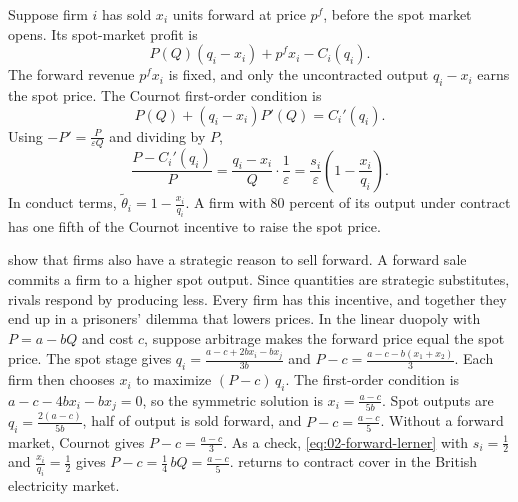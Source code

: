 \begin{example}\label{ex:02-forward}
Suppose firm $i$ has sold $x_i$ units forward at price $p^f$, before the spot market opens. Its spot-market profit is
\begin{equation*}
P(Q)\left(q_i - x_i\right) + p^f x_i - C_i(q_i) .
\end{equation*}
The forward revenue $p^f x_i$ is fixed, and only the uncontracted output $q_i - x_i$ earns the spot price. The Cournot
first-order condition is
\begin{equation*}
P(Q) + \left(q_i - x_i\right) P'(Q) = C_i'(q_i) .
\end{equation*}
Using $-P' = \frac{P}{\varepsilon Q}$ and dividing by $P$,
\begin{equation}\label{eq:02-forward-lerner}
\frac{P - C_i'(q_i)}{P} = \frac{q_i - x_i}{Q}\cdot\frac{1}{\varepsilon}
= \frac{s_i}{\varepsilon}\left(1 - \frac{x_i}{q_i}\right) .
\end{equation}
In conduct terms, $\tilde\theta_i = 1 - \frac{x_i}{q_i}$. A firm with 80 percent of its output under contract has
one fifth of the Cournot incentive to raise the spot price.
\end{example}

\citet{AllazVila1993} show that firms also have a strategic reason to sell forward. A forward sale commits a firm to
a higher spot output. Since quantities are strategic substitutes, rivals respond by producing less. Every firm has
this incentive, and together they end up in a prisoners' dilemma that lowers prices. In the linear duopoly with
$P = a - bQ$ and cost $c$, suppose arbitrage makes the forward price equal the spot price. The spot stage gives
$q_i = \frac{a - c + 2b x_i - b x_j}{3b}$ and $P - c = \frac{a - c - b(x_1 + x_2)}{3}$. Each firm then chooses $x_i$
to maximize $(P - c)\, q_i$. The first-order condition is $a - c - 4b x_i - b x_j = 0$, so the symmetric solution is
$x_i = \frac{a - c}{5b}$. Spot outputs are $q_i = \frac{2(a - c)}{5b}$, half of output is sold forward, and
$P - c = \frac{a - c}{5}$. Without a forward market, Cournot gives $P - c = \frac{a - c}{3}$. As a check,
\eqref{eq:02-forward-lerner} with $s_i = \frac{1}{2}$ and $\frac{x_i}{q_i} = \frac{1}{2}$ gives
$P - c = \frac{1}{4}\, b Q = \frac{a - c}{5}$.  returns to contract cover in the British electricity
market.

